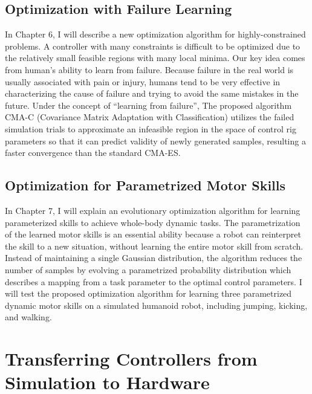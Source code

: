 \subsection{Optimization with Failure Learning}
In Chapter 6, I will describe a new optimization algorithm for
highly-constrained problems.
A controller with many constraints is difficult to be optimized due to the
relatively small feasible regions with many local minima.
Our key idea comes from human’s ability to learn from failure. 
Because failure in the real world is usually associated with pain or injury,
humans tend to be very effective in characterizing the cause of failure and
trying to avoid the same mistakes in the future. 
Under the concept of ``learning from failure'', The proposed algorithm CMA-C
(Covariance Matrix Adaptation with Classification) utilizes the failed
simulation trials to approximate an infeasible region in the space of control
rig parameters so that it can predict validity of newly generated samples,
resulting a faster convergence than the standard CMA-ES.

\subsection{Optimization for Parametrized Motor Skills}
In Chapter 7, I will explain an evolutionary optimization algorithm for
learning parameterized skills to achieve whole-body dynamic tasks.
The parametrization of the learned motor skills is an essential ability
because a robot can reinterpret the skill to a new situation, without
learning the entire motor skill from scratch.
Instead of maintaining a single Gaussian distribution, 
the algorithm reduces the number of samples by evolving a parametrized
probability distribution which describes a mapping from a task parameter
to the optimal control parameters.
I will test the proposed optimization algorithm for learning three parametrized
dynamic motor skills on a simulated humanoid robot, including jumping,
kicking, and walking. 

\section{Transferring Controllers from Simulation to Hardware}


